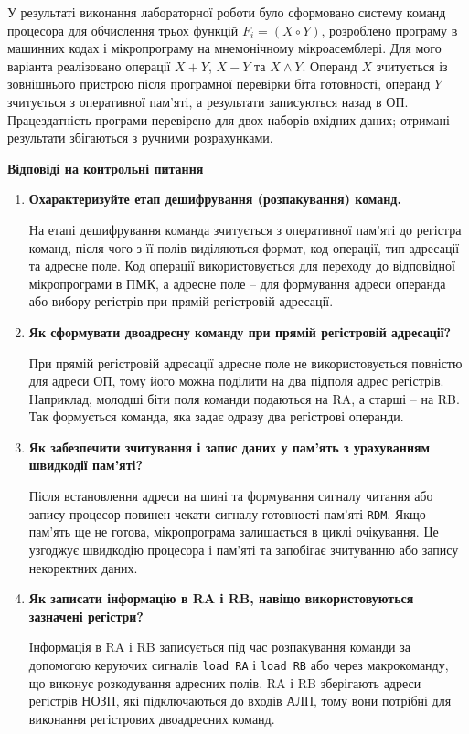 \documentclass[12pt,a4paper]{article}
\newcommand{\sectiontitle}[1]{\begin{center} \textbf{\large #1} \end{center}}
\begin{document}
У результаті виконання лабораторної роботи було сформовано систему команд
процесора для обчислення трьох функцій $F_i = (X \circ Y)$, розроблено програму
в машинних кодах і мікропрограму на мнемонічному мікроасемблері. Для мого
варіанта реалізовано операції $X + Y$, $X - Y$ та $X \wedge Y$. Операнд $X$
зчитується із зовнішнього пристрою після програмної перевірки біта готовності,
операнд $Y$ зчитується з оперативної пам'яті, а результати записуються назад в
ОП. Працездатність програми перевірено для двох наборів вхідних даних; отримані
результати збігаються з ручними розрахунками.

\sectiontitle{Відповіді на контрольні питання}

\begin{enumerate}
    \item \textbf{Охарактеризуйте етап дешифрування (розпакування) команд.}

    На етапі дешифрування команда зчитується з оперативної пам'яті до регістра
    команд, після чого з її полів виділяються формат, код операції, тип адресації
    та адресне поле. Код операції використовується для переходу до відповідної
    мікропрограми в ПМК, а адресне поле -- для формування адреси операнда або
    вибору регістрів при прямій регістровій адресації.

    \item \textbf{Як сформувати двоадресну команду при прямій регістровій адресації?}

    При прямій регістровій адресації адресне поле не використовується повністю
    для адреси ОП, тому його можна поділити на два підполя адрес регістрів.
    Наприклад, молодші біти поля команди подаються на RA, а старші -- на RB.
    Так формується команда, яка задає одразу два регістрові операнди.

    \item \textbf{Як забезпечити зчитування і запис даних у пам'ять з урахуванням швидкодії пам'яті?}

    Після встановлення адреси на шині та формування сигналу читання або запису
    процесор повинен чекати сигналу готовності пам'яті \texttt{RDM}. Якщо пам'ять
    ще не готова, мікропрограма залишається в циклі очікування. Це узгоджує
    швидкодію процесора і пам'яті та запобігає зчитуванню або запису некоректних
    даних.

    \item \textbf{Як записати інформацію в RA і RB, навіщо використовуються зазначені регістри?}

    Інформація в RA і RB записується під час розпакування команди за допомогою
    керуючих сигналів \texttt{load RA} і \texttt{load RB} або через макрокоманду,
    що виконує розкодування адресних полів. RA і RB зберігають адреси регістрів
    НОЗП, які підключаються до входів АЛП, тому вони потрібні для виконання
    регістрових двоадресних команд.


\end{enumerate}
\end{document}
